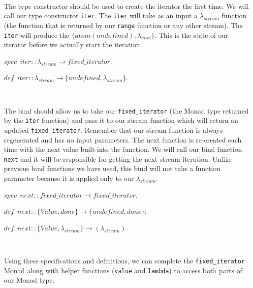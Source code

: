 \documentclass[
]{book}
\begin{document}
\(\nonumber\)

The type constructor should be used to create the iterator the first time. We will call our type constructor \texttt{iter}. The \texttt{iter} will take as an input a \(\lambda_{stream}\) function (the function that is returned by our \texttt{range} function or any other stream). The \texttt{iter} will produce the \(\lbrace atom(unde\mathit{f}ined), \lambda_{next} \rbrace\). This is the state of our iterator before we actually start the iteration.

\begin{formulabox}
\(spec ~ ~ iter :: \lambda_{stream} \rightarrow \mathit{f}ixed\_iterator.\)

\(de\mathit{f} ~ ~ iter :: \lambda_{stream} \rightarrow \lbrace unde\mathit{f}ined, \lambda_{stream} \rbrace.\)

\end{formulabox}

\(\nonumber\)

The bind should allow us to take our \texttt{fixed\_iterator} (the Monad type returned by the \texttt{iter} function) and pass it to our stream function which will return an updated \texttt{fixed\_iterator}. Remember that our stream function is always regenerated and has no input parameters. The next function is re-created each time with the next value built-into the function. We will call our bind function \texttt{next} and it will be responsible for getting the next stream iteration. Unlike previous bind functions we have used, this bind will not take a function parameter because it is applied only to our \(\lambda_{stream}\).

\begin{formulabox}
\(spec ~ ~ next :: \mathit{f}ixed\_iterator \rightarrow \mathit{f}ixed\_iterator.\)

\(de\mathit{f} ~ ~ next :: \lbrace Value, done \rbrace \rightarrow \lbrace unde\mathit{f}ined, done \rbrace;\)

\(de\mathit{f} ~ ~ next :: \lbrace Value, \lambda_{stream} \rbrace \rightarrow (\lambda_{stream}).\)

\end{formulabox}

\(\nonumber\)

Using these specifications and definitions, we can complete the \texttt{fixed\_iterator} Monad along with helper functions (\texttt{value} and \texttt{lambda}) to access both parts of our Monad type.
\end{document}
